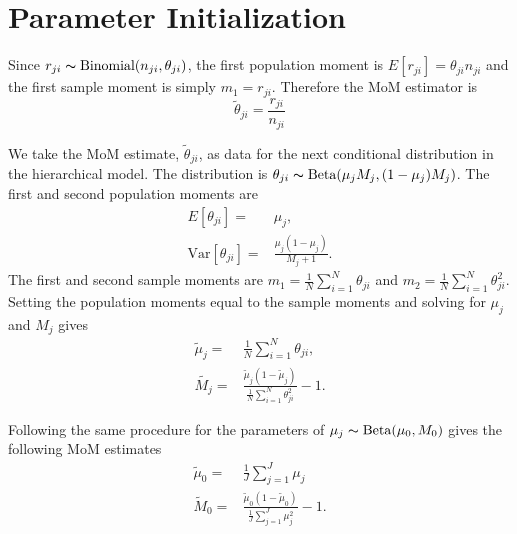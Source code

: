 \documentclass[11pt,reqno]{amsart}
\begin{document}
\appendix

\section{Parameter Initialization}\label{sec:appendix_mom}
Since $r_{ji} \thicksim \text{Binomial}(n_{ji}, \theta_{ji})$, the first population moment is  $E[r_{ji}] = \theta_{ji} n_{ji}$ and the first sample moment is simply $m_1 = r_{ji}$. Therefore the MoM estimator is
\begin{equation}
	\tilde{\theta}_{ji} = \frac{r_{ji}} {n_{ji}}
\end{equation}

We take the MoM estimate, $\tilde{\theta}_{ji}$, as data for the next conditional distribution in the hierarchical model. The distribution is $\theta_{ji} \thicksim \text{Beta}(\mu_jM_j, (1-\mu_j)M_j)$. The first and second population moments are
\begin{eqnarray}
	E[\theta_{ji}] =& \mu_j,\\
	\text{Var}[\theta_{ji}] =& \frac{\mu_j(1-\mu_j)} { M_j + 1 }.
\end{eqnarray}
The first and second sample moments are $m_1 = \frac{1}{N}\sum_{i=1}^N \theta_{ji}$ and $m_2 = \frac{1}{N}\sum_{i=1}^N \theta_{ji}^2$. Setting the population moments equal to the sample moments and solving for $\mu_j$ and $M_j$ gives
\begin{eqnarray}
	\tilde{\mu}_j =& \frac{1}{N} \sum_{i=1}^N \theta_{ji}, \\
	\tilde{M_j} =& \frac{ \tilde{\mu}_j (1 - \tilde{\mu}_j ) } { \frac{1}{N} \sum_{i=1}^N \theta_{ji}^2 } -1.
\end{eqnarray}

Following the same procedure for the parameters of $\mu_j \thicksim \text{Beta}(\mu_0, M_0)$ gives the following MoM estimates
\begin{eqnarray}
	\tilde{\mu}_0 =& \frac{1}{J} \sum_{j=1}^J \mu_j \\
	\tilde{M}_0 =& \frac{ \tilde{\mu}_0 (1 - \tilde{\mu}_0 ) } {\frac{1}{J} \sum_{j=1}^J \mu_j^2 } -1.
\end{eqnarray}





\end{document}
